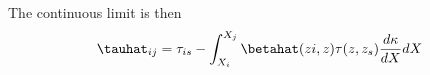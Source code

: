 The continuous limit is then
\begin{equation}
\tauhat_{i j}  = \tau_{i s} - \int_{X_i}^{X_j} \betahat(zi, z) \tau(z, z_s) \frac{d \kappa}{d X} dX
\end{equation}
  
